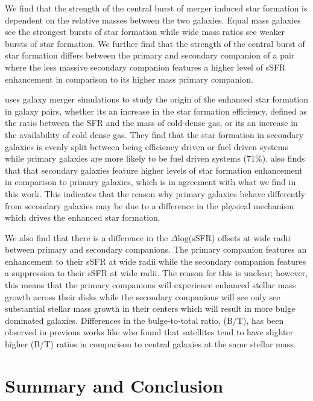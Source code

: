 \documentclass[apj,twocolumn]{emulateapj}
\begin{document}
\begin{CJK*}{UTF8}{gbsn}
We find that the strength of the central burst of merger induced star formation is dependent on the relative masses between the two galaxies. Equal mass galaxies see the strongest bursts of star formation while wide mass ratios see weaker bursts of star formation. We further find that the strength of the central burst of star formation differs between the primary and secondary companion of a pair where the less massive secondary companion features a higher level of sSFR enhancement in comparison to its higher mass primary companion. 

\citet{Moreno:2020} uses galaxy merger simulations to study the origin of the enhanced star formation in galaxy pairs, whether its an increase in the star formation efficiency, defined as the ratio between the SFR and the mass of cold-dense gas, or its an increase in the availability of cold dense gas. They find that the star formation in secondary galaxies is evenly split between being efficiency driven or fuel driven systems while primary galaxies are more likely to be fuel driven systems (71\%). \citet{Moreno:2020} also finds that that secondary galaxies feature higher levels of star formation enhancement in comparison to primary galaxies, which is in agreement with what we find in this work. This indicates that the reason why primary galaxies behave differently from secondary galaxies may be due to a difference in the physical mechanism which drives the enhanced star formation. 

We also find that there is a difference in the $\Delta$log(sSFR) offsets at wide radii between primary and secondary companions. The primary companion features an enhancement to their sSFR at wide radii while the secondary companion features a suppression to their sSFR at wide radii. The reason for this is unclear; however, this means that the primary companions will experience enhanced stellar mass growth across their disks while the secondary companions will see only see substantial stellar mass growth in their centers which will result in more bulge dominated galaxies. Differences in the bulge-to-total ratio, (B/T), has been observed in previous works like \citet{Bluck:2019} who found that satellites tend to have slighter higher (B/T) ratios in comparison to central galaxies at the same stellar mass.


\section{Summary and Conclusion}\label{sec:sum}


\end{CJK*}
\end{document}

